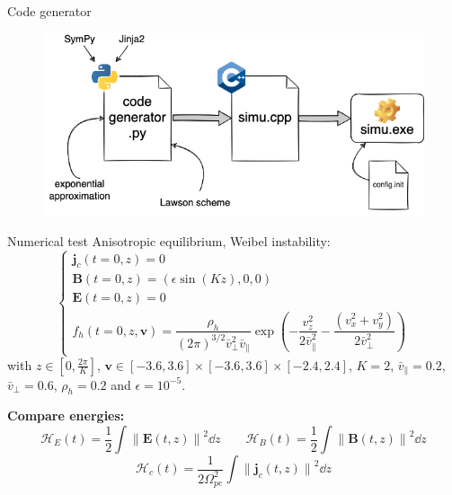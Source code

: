 \documentclass{beamer}
\newcommand{\mbold}[1]{{\textbf{\color{PLB}#1}}}
\newcommand{\Mvb}[1]{\boldsymbol{#1}}
\begin{document}
\begin{frame}{Code generator}
  
  \begin{figure}
    \includegraphics[width=\textwidth]{img/codegen}
  \end{figure}
\end{frame}

\begin{frame}{Numerical test}
  Anisotropic equilibrium, Weibel instability:
  $$
    \begin{cases}
      \Mvb{j}_c(t=0,z) = 0 \\
      \Mvb{B}(t=0,z) = \left( \epsilon \sin(Kz) , 0 , 0\right) \\
      \Mvb{E}(t=0,z) = 0 \\
      f_h(t=0,z,\Mvb{v}) = \dfrac{\rho_h}{ (2\pi)^{3/2} \bar{v}_\perp^2 \bar{v}_\parallel }\exp( -\dfrac{v_z^2}{2\bar{v}_\parallel^2} - \dfrac{(v_x^2 + v_y^2)}{2\bar{v}_\perp^2}  )
    \end{cases}
  $$
  with $z\in[0,\frac{2\pi}{K}]$, $\Mvb{v}\in[-3.6,3.6]\times[-3.6,3.6]\times[-2.4,2.4]$, $K=2$, $\bar{v}_\parallel=0.2$, $\bar{v}_\perp = 0.6$, $\rho_h=0.2$ and $\epsilon=10^{-5}$.

  \mbold{Compare energies:}
  $$
    \mathcal{H}_E(t) = \frac{1}{2}\int {\| \Mvb{E}(t,z) \|}^2\dd{z}
    \qquad
    \mathcal{H}_B(t) = \frac{1}{2}\int {\| \Mvb{B}(t,z) \|}^2\dd{z}
  $$
  $$
    \mathcal{H}_c(t) = \frac{1}{2\Omega_{pe}^2}\int {\| \Mvb{j}_c(t,z) \|}^2\dd{z}
  $$
\end{frame}
\end{document}
